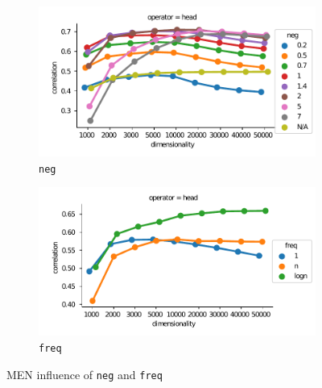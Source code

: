 \begin{figure}
  \centering

  \begin{subfigure}[t]{0.49\textwidth}
    \includegraphics[width=\textwidth]{supplement/figures/men-interaction-neg}

  \caption{\texttt{neg}}
  \label{fig:men-neg}
  \end{subfigure}
  \begin{subfigure}[t]{0.49\textwidth}
    \includegraphics[width=\textwidth]{supplement/figures/men-interaction-freq}

  \caption{\texttt{freq}}
  \label{fig:men-freq}
  \end{subfigure}

  \caption{MEN influence of \texttt{neg} and \texttt{freq}}
\end{figure}

